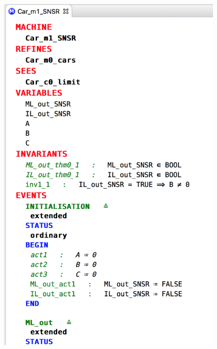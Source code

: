 \begin{figure}[!htbp]
	\centering
	\ifplastex
	\includegraphics[width=512]{figures/Flattened_var_m1_snsr}
	\else

\end{figure}

